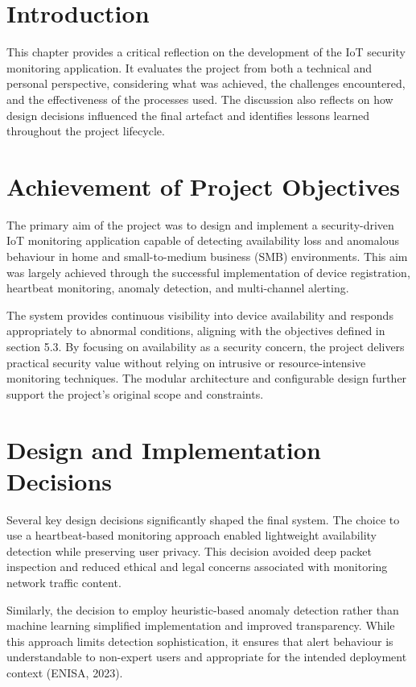 \section{Introduction}

This chapter provides a critical reflection on the development of the IoT security monitoring application. It evaluates the project from both a technical and personal perspective, considering what was achieved, the challenges encountered, and the effectiveness of the processes used. The discussion also reflects on how design decisions influenced the final artefact and identifies lessons learned throughout the project lifecycle.

\section{Achievement of Project Objectives}

The primary aim of the project was to design and implement a security-driven IoT monitoring application capable of detecting availability loss and anomalous behaviour in home and small-to-medium business (SMB) environments. This aim was largely achieved through the successful implementation of device registration, heartbeat monitoring, anomaly detection, and multi-channel alerting.

The system provides continuous visibility into device availability and responds appropriately to abnormal conditions, aligning with the objectives defined in section 5.3. By focusing on availability as a security concern, the project delivers practical security value without relying on intrusive or resource-intensive monitoring techniques. The modular architecture and configurable design further support the project's original scope and constraints.

\section{Design and Implementation Decisions}

Several key design decisions significantly shaped the final system. The choice to use a heartbeat-based monitoring approach enabled lightweight availability detection while preserving user privacy. This decision avoided deep packet inspection and reduced ethical and legal concerns associated with monitoring network traffic content.

Similarly, the decision to employ heuristic-based anomaly detection rather than machine learning simplified implementation and improved transparency. While this approach limits detection sophistication, it ensures that alert behaviour is understandable to non-expert users and appropriate for the intended deployment context (ENISA, 2023).

